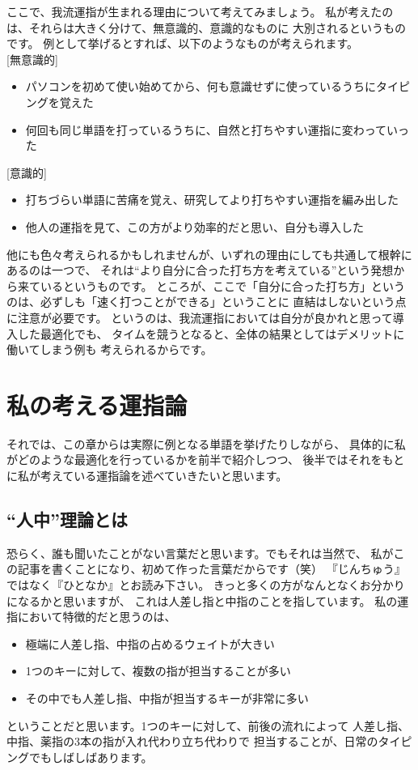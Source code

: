 ここで、我流運指が生まれる理由について考えてみましょう。
私が考えたのは、それらは大きく分けて、無意識的、意識的なものに
大別されるというものです。
例として挙げるとすれば、以下のようなものが考えられます。\\

[無意識的]
\begin{itemize}
 \item パソコンを初めて使い始めてから、何も意識せずに使っているうちにタイピングを覚えた
 \item 何回も同じ単語を打っているうちに、自然と打ちやすい運指に変わっていった
\end{itemize}

[意識的]
\begin{itemize}
 \item 打ちづらい単語に苦痛を覚え、研究してより打ちやすい運指を編み出した
 \item 他人の運指を見て、この方がより効率的だと思い、自分も導入した\\
\end{itemize}

他にも色々考えられるかもしれませんが、いずれの理由にしても共通して根幹にあるのは一つで、
それは“より自分に合った打ち方を考えている”という発想から来ているというものです。
ところが、ここで「自分に合った打ち方」というのは、必ずしも「速く打つことができる」ということに
直結はしないという点に注意が必要です。
というのは、我流運指においては自分が良かれと思って導入した最適化でも、
タイムを競うとなると、全体の結果としてはデメリットに働いてしまう例も
考えられるからです。

\section{私の考える運指論}

それでは、この章からは実際に例となる単語を挙げたりしながら、
具体的に私がどのような最適化を行っているかを前半で紹介しつつ、
後半ではそれをもとに私が考えている運指論を述べていきたいと思います。

\subsection{“人中”理論とは}

恐らく、誰も聞いたことがない言葉だと思います。でもそれは当然で、
私がこの記事を書くことになり、初めて作った言葉だからです（笑）
『じんちゅう』ではなく『ひとなか』とお読み下さい。
きっと多くの方がなんとなくお分かりになるかと思いますが、
これは人差し指と中指のことを指しています。
私の運指において特徴的だと思うのは、
\begin{itemize}
 \item 極端に人差し指、中指の占めるウェイトが大きい
 \item 1つのキーに対して、複数の指が担当することが多い
 \item その中でも人差し指、中指が担当するキーが非常に多い
\end{itemize}
ということだと思います。1つのキーに対して、前後の流れによって
人差し指、中指、薬指の3本の指が入れ代わり立ち代わりで
担当することが、日常のタイピングでもしばしばあります。
